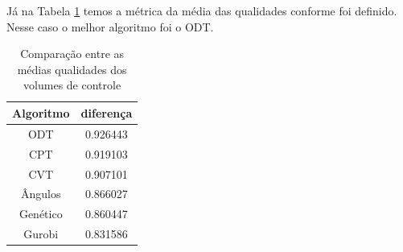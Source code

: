 Já na Tabela \ref{tab:comparacao-qualidade} temos a métrica da média das qualidades conforme foi definido. Nesse caso o melhor algoritmo foi o ODT.

\begin{table}
    \centering
    \par\caption{Comparação entre as médias qualidades dos volumes de controle}
    \begin{tabular}{c|c}
        Algoritmo&diferença\\\hline\hline
        ODT      &  0.926443 \\\hline
        CPT      &  0.919103 \\\hline
        CVT      &  0.907101 \\\hline
        Ângulos  &  0.866027 \\\hline
        Genético &  0.860447 \\\hline
        Gurobi   &  0.831586 \\\hline
    \end{tabular}
    \label{tab:comparacao-qualidade}
\end{table}